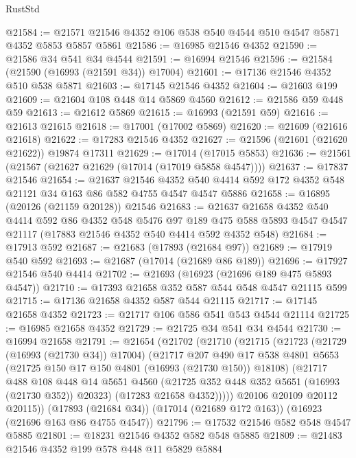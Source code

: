 \begin{lexlean}{RustStd}
\begin{coremodule}
{\begin{coremodule}
{{{{{{{{{{{{{{{{{{{{{{{{{{{{{{{{{{{{{{{{{{{{{{{{{{{{{{{@21584 := @21571 @21546 @4352 @106 @538 @540 @4544 @510 @4547 @5871 @4352 @5853 @5857 @5861
@21586 := @16985 @21546 @4352
@21590 := @21586 @34 @541 @34 @4544
@21591 := @16994 @21546
@21596 := @21584 (@21590 (@16993 (@21591 @34)) @17004)
@21601 := @17136 @21546 @4352 @510 @538 @5871
@21603 := @17145 @21546 @4352
@21604 := @21603 @199
@21609 := @21604 @108 @448 @14 @5869 @4560
@21612 := @21586 @59 @448 @59
@21613 := @21612 @5869
@21615 := @16993 (@21591 @59)
@21616 := @21613 @21615
@21618 := @17001 (@17002 @5869)
@21620 := @21609 (@21616 @21618)
@21622 := @17283 @21546 @4352
@21627 := @21596 (@21601 (@21620 @21622)) @19874 @17311
@21629 := @17014 (@17015 @5853)
@21636 := @21561 (@21567 (@21627 @21629 (@17014 (@17019 @5858 @4547))))
@21637 := @17837 @21546
@21654 := @21637
    @21546
    @4352
    @540
    @4414
    @592
    @172
    @4352
    @548
    @21121
    @34
    @163
    @86
    @582
    @4755
    @4547
    @4547
    @5886
@21658 := @16895 (@20126 (@21159 @20128)) @21546
@21683 := @21637
    @21658
    @4352
    @540
    @4414
    @592
    @86
    @4352
    @548
    @5476
    @97
    @189
    @475
    @588
    @5893
    @4547
    @4547
    @21117
    (@17883 @21546 @4352 @540 @4414 @592 @4352 @548)
@21684 := @17913 @592
@21687 := @21683 (@17893 (@21684 @97))
@21689 := @17919 @540 @592
@21693 := @21687 (@17014 (@21689 @86 @189))
@21696 := @17927 @21546 @540 @4414
@21702 := @21693 (@16923 (@21696 @189 @475 @5893 @4547))
@21710 := @17393 @21658 @352 @587 @544 @548 @4547 @21115 @599
@21715 := @17136 @21658 @4352 @587 @544 @21115
@21717 := @17145 @21658 @4352
@21723 := @21717 @106 @586 @541 @543 @4544 @21114
@21725 := @16985 @21658 @4352
@21729 := @21725 @34 @541 @34 @4544
@21730 := @16994 @21658
@21791 := @21654
    (@21702
      (@21710
        (@21715
          (@21723
            (@21729 (@16993 (@21730 @34)) @17004)
            (@21717
              @207
              @490
              @17
              @538
              @4801
              @5653
              (@21725 @150 @17 @150 @4801 (@16993 (@21730 @150)) @18108)
              (@21717
                @488
                @108
                @448
                @14
                @5651
                @4560
                (@21725 @352 @448 @352 @5651 (@16993 (@21730 @352)) @20323)
                (@17283 @21658 @4352)))))
        @20106
        @20109
        @20112
        @20115))
    (@17893 (@21684 @34))
    (@17014 (@21689 @172 @163))
    (@16923 (@21696 @163 @86 @4755 @4547))
@21796 := @17532 @21546 @582 @548 @4547 @5885
@21801 := @18231 @21546 @4352 @582 @548 @5885
@21809 := @21483 @21546 @4352 @199 @578 @448 @11 @5829 @5884
}}}}}}}}}}}}}}}}}}}}}}}}}}}}}}}}}}}}}}}}}}}}}}}}}}}}}}}
\end{coremodule}}
\end{coremodule}
\end{lexlean}
